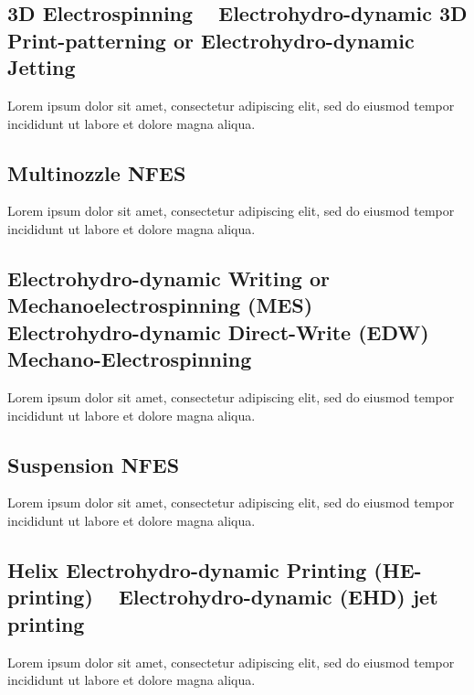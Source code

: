 \documentclass[5p,,preprint,12pt,twocolumn]{elsarticle}
\begin{document}
\subsection{3D Electrospinning \unskip~\protect\cite{527120:11974313} \mbox{}\protect\newline Electrohydro-dynamic 3D Print-patterning or Electrohydro-dynamic Jetting \unskip~\protect\cite{527120:11974310}}Lorem ipsum dolor sit amet, consectetur adipiscing elit, sed do eiusmod tempor incididunt ut labore et dolore magna aliqua.



\subsection{Multinozzle NFES \unskip~\protect\cite{527120:11974322,527120:11974323,527120:11974324}}Lorem ipsum dolor sit amet, consectetur adipiscing elit, sed do eiusmod tempor incididunt ut labore et dolore magna aliqua.



\subsection{Electrohydro-dynamic Writing or Mechanoelectrospinning (MES) \unskip~\protect\cite{527120:11974311} \mbox{}\protect\newline Electrohydro-dynamic Direct-Write (EDW) \unskip~\protect\cite{527120:11974328} \mbox{}\protect\newline Mechano-Electrospinning \unskip~\protect\cite{527120:11974304}}Lorem ipsum dolor sit amet, consectetur adipiscing elit, sed do eiusmod tempor incididunt ut labore et dolore magna aliqua.



\subsection{Suspension NFES \unskip~\protect\cite{527120:12033656}}Lorem ipsum dolor sit amet, consectetur adipiscing elit, sed do eiusmod tempor incididunt ut labore et dolore magna aliqua.



\subsection{Helix Electrohydro-dynamic Printing (HE-printing) \unskip~\protect\cite{527120:11974308} \mbox{}\protect\newline Electrohydro-dynamic (EHD) jet printing \unskip~\protect\cite{527120:11974320}}Lorem ipsum dolor sit amet, consectetur adipiscing elit, sed do eiusmod tempor incididunt ut labore et dolore magna aliqua.
\end{document}

